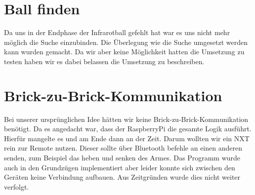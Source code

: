 \section{Ball finden}
Da uns in der Endphase der Infrarotball gefehlt hat war es uns nicht mehr möglich die Suche einzubinden. Die Überlegung wie die Suche umgesetzt werden kann wurden gemacht. Da wir aber keine Möglichkeit hatten die Umsetzung zu testen haben wir es dabei belassen die Umsetzung zu beschreiben.

\section{Brick-zu-Brick-Kommunikation}
Bei unserer ursprünglichen Idee hätten wir keine Brick-zu-Brick-Kommunikation benötigt. Da es angedacht war, dass der RaspberryPi die gesamte Logik ausführt. Hierfür mangelte es und am Ende dann an der Zeit. Darum wollten wir ein NXT rein zur Remote nutzen. Dieser sollte über Bluetooth befehle an einen anderen senden, zum Beispiel das heben und senken des Armes. Das Programm wurde auch in den Grundzügen implementiert aber leider konnte sich zwischen den Geräten keine Verbindung aufbauen. Aus Zeitgründen wurde dies nicht weiter verfolgt.

